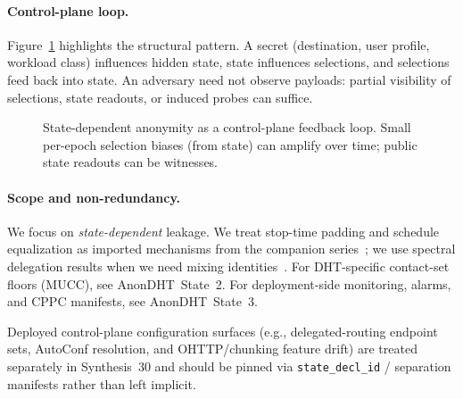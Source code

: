 \documentclass[11pt]{article}
\begin{document}
\paragraph{Control-plane loop.}
Figure~\ref{fig:control-plane-loop} highlights the structural pattern.
A secret (destination, user profile, workload class) influences hidden state, state influences selections, and selections feed back into state.
An adversary need not observe payloads: partial visibility of selections, state readouts, or induced probes can suffice.

\begin{figure}[t]
  \centering
  \caption{State-dependent anonymity as a control-plane feedback loop.
  Small per-epoch selection biases (from state) can amplify over time; public state readouts can be witnesses.
  }
  \label{fig:control-plane-loop}
\end{figure}

\paragraph{Scope and non-redundancy.}
We focus on \emph{state-dependent} leakage.
We treat stop-time padding and schedule equalization as imported mechanisms from the companion series~\cite{series:stoptimeaddendum,series:schedcompiler};
we use spectral delegation results when we need mixing identities~\cite{series:spectral}.
For DHT-specific contact-set floors (MUCC), see AnonDHT~State~2.\cite{series:state2}
For deployment-side monitoring, alarms, and CPPC manifests, see AnonDHT~State~3.\cite{series:state3}

Deployed control-plane configuration surfaces (e.g., delegated-routing endpoint sets, AutoConf resolution, and OHTTP/chunking feature drift) are treated separately in Synthesis~30 and should be pinned via \texttt{state\_decl\_id} / separation manifests rather than left implicit.\cite{series:deployedsurfaces}
\end{document}
